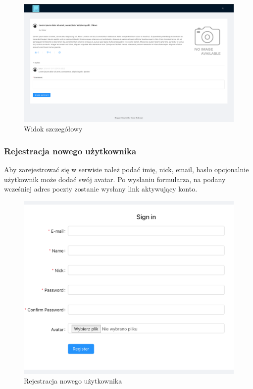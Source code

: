 \documentclass[declaration,shortabstract]{iithesis}
\begin{document}
\begin{figure}
    \centering
    \includegraphics[width=\textwidth]{images/widok_postu.png}
    \caption{Widok szczegółowy}
    \label{fig:my_label}
\end{figure}

\subsubsection{Rejestracja nowego użytkownika}
Aby zarejestrować się w serwisie należ podać imię, nick, email, hasło opcjonalnie użytkownik może dodać swój avatar. Po wysłaniu formularza, na podany wcześniej adres poczty zostanie wysłany link aktywujący konto.

\begin{figure}
    \centering
    \includegraphics[width=\textwidth]{images/rejestracja.png}
    \caption{Rejestracja nowego użytkownika}
    \label{fig:my_label}
\end{figure}
\end{document}
